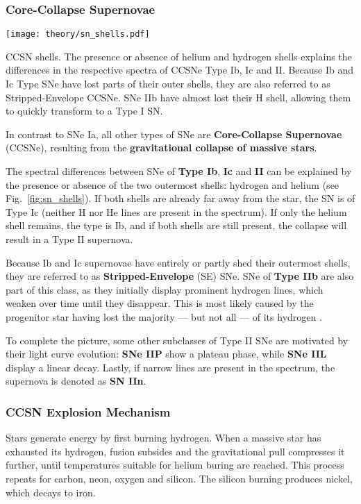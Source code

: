 \subsubsection{Core-Collapse Supernovae}\label{ccsne}

\begin{marginfigure}
    \texttt{[image: theory/sn\_shells.pdf]}
    \caption[CCSN shells]{CCSN shells. The presence or absence of helium and hydrogen shells explains the differences in the respective spectra of CCSNe Type Ib, Ic and II. Because Ib and Ic Type SNe have lost parts of their outer shells, they are also referred to as Stripped-Envelope CCSNe. SNe IIb have almost lost their H shell, allowing them to quickly transform to a Type I SN.}
\end{marginfigure}

In contrast to SNe Ia, all other types of SNe are \textbf{Core-Collapse Supernovae} (CCSNe), resulting from the \textbf{gravitational collapse of massive stars}.

The spectral differences between SNe of \textbf{Type Ib}, \textbf{Ic} and \textbf{II} can be explained by the presence or absence of the two outermost shells: hydrogen and helium (see Fig.~\ref{fig:sn_shells}). If both shells are already far away from the star, the SN is of Type Ic (neither H nor He lines are present in the spectrum). If only the helium shell remains, the type is Ib, and if both shells are still present, the collapse will result in a Type II supernova.

Because Ib and Ic supernovae have entirely or partly shed their outermost shells, they are referred to as \textbf{Stripped-Envelope} (SE) SNe. SNe of \textbf{Type IIb} are also part of this class, as they initially display prominent hydrogen lines, which weaken over time until they disappear. This is most likely caused by the progenitor star having lost the majority --- but not all --- of its hydrogen .

To complete the picture, some other subclasses of Type II SNe are motivated by their light curve evolution: \textbf{SNe IIP} show a plateau phase, while \textbf{SNe IIL} display a linear decay. Lastly, if narrow lines are present in the spectrum, the supernova is denoted as \textbf{SN IIn}.

\subsubsection{CCSN Explosion Mechanism}
Stars generate energy by first burning hydrogen. When a massive star has exhausted its hydrogen, fusion subsides and the gravitational pull compresses it further, until temperatures suitable for helium buring are reached. This process repeats for carbon, neon, oxygen and silicon. The silicon burning produces nickel, which decays to iron.

